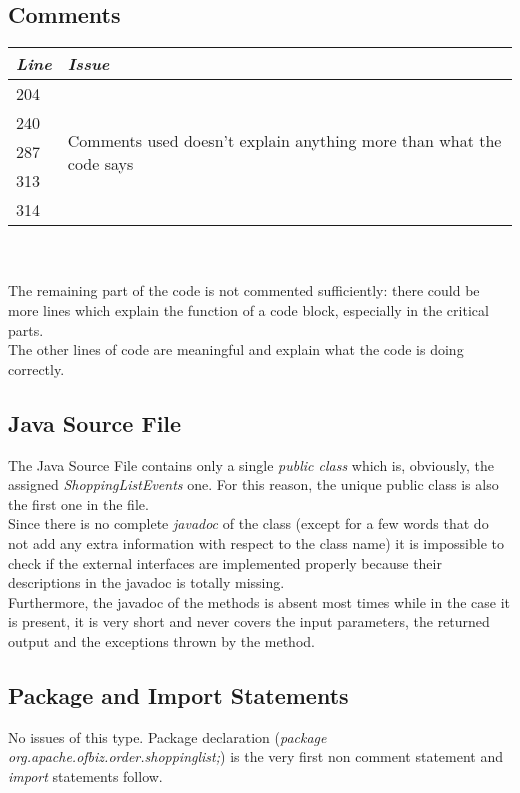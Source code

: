 \documentclass[11pt,a4paper]{report}
\begin{document}
\subsection{Comments}
\begin{tabularx}{\textwidth}{|l|X|}
	\hline
	\textit{Line} & \textit{Issue}\\
	\hline
	\hline
	204 & \multirow{5}{\linewidth}{Comments used doesn't explain anything more than what the code says}\\
	240 & \\
	287 & \\
	313 & \\
	314 & \\
	\hline
\end{tabularx}
\\\\
The remaining part of the code is not commented sufficiently: there could be more lines which explain the function of a code block, especially in the critical parts.\\The other lines of code are meaningful and explain what the code is doing correctly.
\subsection{Java Source File}
The Java Source File contains only a single \textit{public class} which is, obviously, the assigned \textit{ShoppingListEvents} one. For this reason, the unique public class is also the first one in the file.\\
Since there is no complete \textit{javadoc} of the class (except for a few words that do not add any extra information with respect to the class name) it is impossible to check if the external interfaces are implemented properly because their descriptions in the javadoc is totally missing.\\
Furthermore, the javadoc of the methods is absent most times while in the case it is present, it is very short and never covers the input parameters, the returned output and the exceptions thrown by the method.
\subsection{Package and Import Statements}
No issues of this type. Package declaration (\textit{package org.apache.ofbiz.order.shoppinglist;}) is the very first non comment statement and \textit{import} statements follow.
\end{document}

